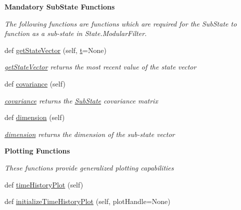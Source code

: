\begin{Indent}{\bf Mandatory Sub\+State Functions}\par
{\em The following functions are functions which are required for the Sub\+State to function as a sub-\/state in State.\+Modular\+Filter. }\begin{DoxyCompactItemize}
\item 
def \hyperlink{classmodest_1_1substates_1_1substate_1_1SubState_a1d8050de59c58969164f577899a55aa2}{get\+State\+Vector} (self, \hyperlink{classmodest_1_1substates_1_1correlationvector_1_1CorrelationVector_a127ca6c8eed6a2e822dbac7e83458bf3}{t}=None)
\begin{DoxyCompactList}\small\item\em \hyperlink{classmodest_1_1substates_1_1substate_1_1SubState_a1d8050de59c58969164f577899a55aa2}{get\+State\+Vector} returns the most recent value of the state vector \end{DoxyCompactList}\item 
def \hyperlink{classmodest_1_1substates_1_1substate_1_1SubState_a6e308aadd13962e476d2892ec728e3a5}{covariance} (self)
\begin{DoxyCompactList}\small\item\em \hyperlink{classmodest_1_1substates_1_1substate_1_1SubState_a6e308aadd13962e476d2892ec728e3a5}{covariance} returns the \hyperlink{classmodest_1_1substates_1_1substate_1_1SubState}{Sub\+State} covariance matrix \end{DoxyCompactList}\item 
def \hyperlink{classmodest_1_1substates_1_1substate_1_1SubState_ab9027f6d1d7d57c47731612f519b7ee6}{dimension} (self)
\begin{DoxyCompactList}\small\item\em \hyperlink{classmodest_1_1substates_1_1substate_1_1SubState_ab9027f6d1d7d57c47731612f519b7ee6}{dimension} returns the dimension of the sub-\/state vector \end{DoxyCompactList}\end{DoxyCompactItemize}
\end{Indent}
\begin{Indent}{\bf Plotting Functions}\par
{\em These functions provide generalized plotting capabilities }\begin{DoxyCompactItemize}
\item 
def \hyperlink{classmodest_1_1substates_1_1substate_1_1SubState_a643678c1193dd4029683a437e84229ac}{time\+History\+Plot} (self)
\item 
def \hyperlink{classmodest_1_1substates_1_1substate_1_1SubState_a1853d44036e3ed35ada02414ea29f8ab}{initialize\+Time\+History\+Plot} (self, plot\+Handle=None)
\end{DoxyCompactItemize}
\end{Indent}
